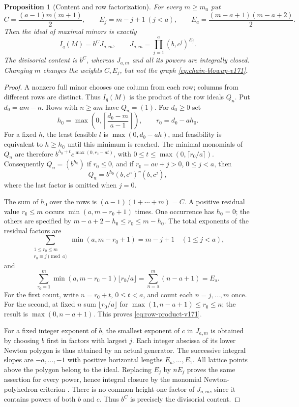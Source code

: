 \documentclass[11pt,reqno]{amsart}
\numberwithin{equation}{section}
\newtheorem{proposition}[theorem]{Proposition}
\theoremstyle{definition}\newtheorem{definition}[theorem]{Definition}
\theoremstyle{remark}\newtheorem{remark}[theorem]{Remark}
\begin{document}
\begin{proposition}[Content and row factorization]
\label{prop:chain-factorization-v171}
For every $m\geq m_a$ put
\[
 C=\frac{(a-1)m(m+1)}2,\qquad
 E_j=m-j+1\ (j<a),\qquad
 E_a=\frac{(m-a+1)(m-a+2)}2.
\]
Then the ideal of maximal minors is exactly
\begin{equation}\label{eq:row-product-v171}
 I_q(M)=b^C J_{a,m},\qquad
 J_{a,m}=\prod_{j=1}^a(b,c^j)^{E_j}.
\end{equation}
The divisorial content is $b^C$, whereas $J_{a,m}$ and all its powers
are integrally closed. Changing $m$ changes the weights $C,E_j$, but
not the graph \eqref{eq:chain-blowup-v171}.
\end{proposition}
\begin{proof}
A nonzero full minor chooses one column from each row; columns from
different rows are distinct. Thus $I_q(M)$ is the product of the row
ideals $Q_n$. Put $d_0=am-n$. Rows with $n\geq am$ have $Q_n=(1)$.
For $d_0\geq0$ set
\[
 h_0=\max\left(0,\left\lceil\frac{d_0-m}{a-1}\right\rceil\right),
 \qquad r_0=d_0-ah_0.
\]
For a fixed $h$, the least feasible $l$ is $\max(0,d_0-ah)$, and
feasibility is equivalent to $h\geq h_0$ until this minimum is reached.
The minimal monomials of $Q_n$ are therefore
$b^{h_0+t}c^{\max(0,r_0-at)}$, with
$0\leq t\leq\max(0,\lceil r_0/a\rceil)$. Consequently $Q_n=(b^{h_0})$
if $r_0\leq0$, and if $r_0=av+j>0$, $0\leq j<a$, then
\[
 Q_n=b^{h_0}(b,c^a)^v(b,c^j),
\]
where the last factor is omitted when $j=0$.

The sum of $h_0$ over the rows is
$(a-1)(1+\cdots+m)=C$. A positive residual value $r_0\leq m$ occurs
$\min(a,m-r_0+1)$ times. One occurrence has $h_0=0$; the others are
specified by $m-a+2-h_0\leq r_0\leq m-h_0$. The total exponents of
the residual factors are
\[
 \sum_{\substack{1\leq r_0\leq m\\r_0\equiv j\pmod a}}
       \min(a,m-r_0+1)=m-j+1\quad(1\leq j<a),
\]
and
\[
 \sum_{r_0=1}^m\min(a,m-r_0+1)\lfloor r_0/a\rfloor
 =\sum_{n=a}^m(n-a+1)=E_a.
\]
For the first count, write $n=r_0+t$, $0\leq t<a$, and count each
$n=j,\ldots,m$ once. For the second, at fixed $n$ sum
$\lfloor r_0/a\rfloor$ for
$\max(1,n-a+1)\leq r_0\leq n$; the result is $\max(0,n-a+1)$.
This proves \eqref{eq:row-product-v171}.

For a fixed integer exponent of $b$, the smallest exponent of $c$
in $J_{a,m}$ is obtained by choosing $b$ first in factors with largest
$j$. Each integer abscissa of its lower Newton polygon is thus
attained by an actual generator. The successive integral slopes
are $-a,\ldots,-1$ with positive horizontal lengths $E_a,\ldots,E_1$.
All lattice points above the polygon belong to the ideal. Replacing
$E_j$ by $nE_j$ proves the same assertion for every power, hence
integral closure by the monomial Newton-polyhedron criterion
\cite[Proposition 1.4.6]{HunekeSwanson171}. There is no common
height-one factor of $J_{a,m}$, since it contains powers of both $b$
and $c$. Thus $b^C$ is precisely the divisorial content.
\end{proof}
\end{document}

